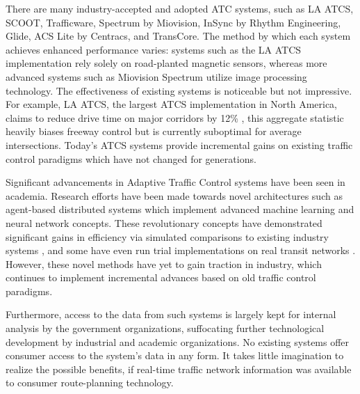 \documentclass{report}
\begin{document}
There are many industry-accepted and adopted ATC systems, such as LA ATCS, SCOOT, Trafficware, Spectrum by Miovision, InSync by Rhythm Engineering, Glide, ACS Lite by Centracs, and TransCore.
The method by which each system achieves enhanced performance varies: systems such as the LA ATCS implementation rely solely on road-planted magnetic sensors, whereas more advanced systems such as Miovision Spectrum utilize image processing technology.
The effectiveness of existing systems is noticeable but not impressive.
For example, LA ATCS, the largest ATCS implementation in North America, claims to reduce drive time on major corridors by 12\% \cite{la-atcs-article}, this aggregate statistic heavily biases freeway control but is currently suboptimal for average intersections.
Today's ATCS systems provide incremental gains on existing traffic control paradigms which have not changed for generations.

Significant advancements in Adaptive Traffic Control systems have been seen in academia.
Research efforts have been made towards novel architectures such as agent-based distributed systems which implement advanced machine learning and neural network concepts.
These revolutionary concepts have demonstrated significant gains in efficiency via simulated comparisons to existing industry systems \cite{1688100, 5073360, uot-article}, and some have even run trial implementations on real transit networks \cite{uot-article}.
However, these novel methods have yet to gain traction in industry, which continues to implement incremental advances based on old traffic control paradigms.

Furthermore, access to the data from such systems is largely kept for internal analysis by the government organizations, suffocating further technological development by industrial and academic organizations.
No existing systems offer consumer access to the system's data in any form.
It takes little imagination to realize the possible benefits, if real-time traffic network information was available to consumer route-planning technology.
\end{document}
